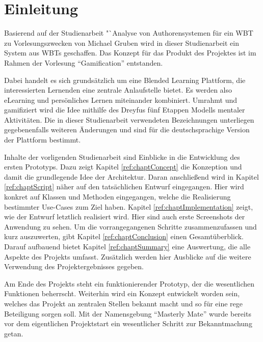 \chapter{Einleitung}\label{ref:chaptIntroduction}
Basierend auf der Studienarbeit "`Analyse von Authorensystemen für ein WBT zu
Vorlesungszwecken von Michael Gruben \cite{gruben:2012} wird in dieser
Studienarbeit ein System aus \ac{WBT}s geschaffen. Das Konzept für das
Produkt des Projektes ist im Rahmen der Vorlesung "`Gamification"' entstanden.

Dabei handelt es sich grundsätzlich um eine Blended Learning Plattform, die
interessierten Lernenden eine zentrale Anlaufstelle bietet. Es werden also
eLearning und persönliches Lernen miteinander kombiniert. Umrahmt und
gamifiziert wird die Idee mithilfe des Dreyfus fünf Etappen Modells mentaler
Aktivitäten. Die in dieser Studienarbeit verwendeten Bezeichnungen unterliegen
gegebenenfalls weiteren Änderungen und sind für die deutschsprachige Version der
Plattform bestimmt.

Inhalte der vorligenden Studienarbeit sind Einblicke in die Entwicklung des
ersten Prototyps. Dazu zeigt Kapitel \ref{ref:chaptConcept} die Konzeption und
damit die grundlegende Idee der Architektur. Daran anschließend wird in Kapitel
\ref{ref:chaptScript} näher auf den tatsächlichen Entwurf eingegangen. Hier
wird konkret auf Klassen und Methoden eingegangen, welche die Realisierung
bestimmter Use-Cases zum Ziel haben. Kapitel \ref{ref:chaptImplementation}
zeigt, wie der Entwurf letztlich realisiert wird. Hier sind auch erste
Screenshots der Anwendung zu sehen. Um die vorrangegangenen Schritte
zusammenzufassen und kurz auszuwerten, gibt Kapitel \ref{ref:chaptConclusion}
einen Gesamtüberblick. Darauf aufbauend bietet Kapitel \ref{ref:chaptSummary}
eine Auswertung, die alle Aspekte des Projekts umfasst. Zusätzlich werden hier
Ausblicke auf die weitere Verwendung des Projektergebnisses gegeben.

Am Ende des Projekts steht ein funktionierender Prototyp, der die
wesentlichen Funktionen beherrscht. Weiterhin wird ein Konzept entwickelt worden
sein, welches das Projekt an zentralen Stellen bekannt macht und so für eine
rege Beteiligung sorgen soll. Mit der Namensgebung "`Masterly Mate"' wurde
bereits vor dem eigentlichen Projektstart ein wesentlicher Schritt zur
Bekanntmachung getan.